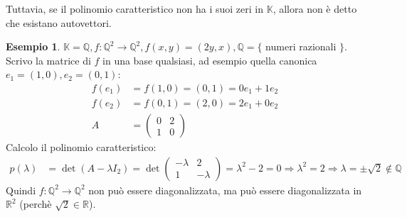 \documentclass[a4paper]{article}
\theoremstyle{definition}
\newtheorem*{es}{Esempio}
\begin{document}
	Tuttavia, se il polinomio caratteristico non ha i suoi zeri in $\mathbb{K}$, allora non è detto che esistano autovettori.
	\begin{es}
		$\mathbb{K} = \mathbb{Q}, f: \mathbb{Q}^2 \to \mathbb{Q}^2, f(x, y) = (2y, x), \mathbb{Q} = \{$ numeri razionali $\}$. \\
		Scrivo la matrice di $f$ in una base qualsiasi, ad esempio quella canonica $e_1 = (1, 0), e_2 = (0, 1)$:
		\begin{align*}
			f(e_1) &= f(1, 0) = (0, 1) = 0e_1 + 1e_2 \\
			f(e_2) &= f(0, 1) = (2, 0) = 2e_1 + 0e_2 \\
			A &= \begin{pmatrix}
				0 & 2 \\
				1 & 0
			\end{pmatrix}
		\end{align*}
		Calcolo il polinomio caratteristico:
		\begin{align*}
			p(\lambda) &= \det(A - \lambda I_2) = \det \begin{pmatrix}
				- \lambda & 2 \\
				1 & - \lambda
			\end{pmatrix} = \lambda^2 - 2 = 0 \Rightarrow \lambda^2 = 2 \Rightarrow \lambda = \pm \sqrt{2} \notin \mathbb{Q}
		\end{align*}
		Quindi $f: \mathbb{Q}^2 \to \mathbb{Q}^2$ non può essere diagonalizzata, ma può essere diagonalizzata in $\mathbb{R}^2$ (perchè $\sqrt{2} \in \mathbb{R}$).
	\end{es}
\end{document}

